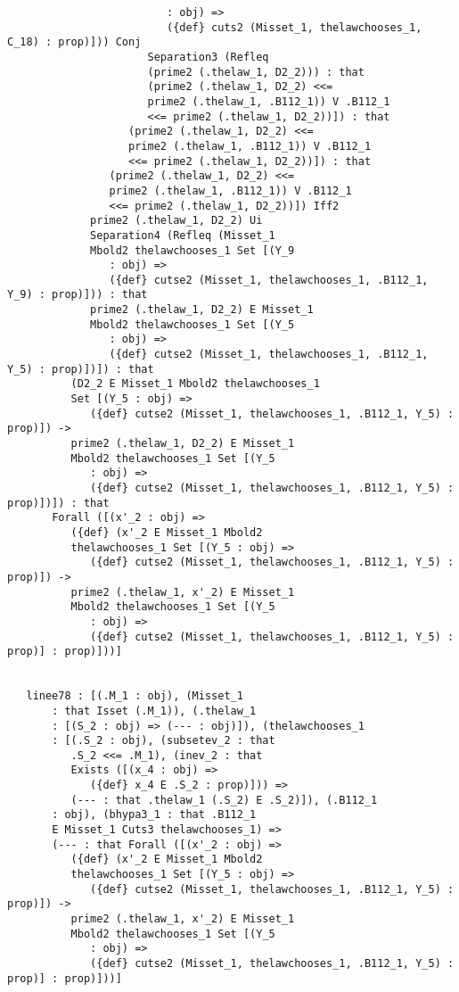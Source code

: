 \documentclass[12pt]{article}
\begin{document}
\begin{verbatim}
                         : obj) => 
                         ({def} cuts2 (Misset_1, thelawchooses_1, C_18) : prop)])) Conj 
                      Separation3 (Refleq 
                      (prime2 (.thelaw_1, D2_2))) : that 
                      (prime2 (.thelaw_1, D2_2) <<= 
                      prime2 (.thelaw_1, .B112_1)) V .B112_1 
                      <<= prime2 (.thelaw_1, D2_2))]) : that 
                   (prime2 (.thelaw_1, D2_2) <<= 
                   prime2 (.thelaw_1, .B112_1)) V .B112_1 
                   <<= prime2 (.thelaw_1, D2_2))]) : that 
                (prime2 (.thelaw_1, D2_2) <<= 
                prime2 (.thelaw_1, .B112_1)) V .B112_1 
                <<= prime2 (.thelaw_1, D2_2))]) Iff2 
             prime2 (.thelaw_1, D2_2) Ui 
             Separation4 (Refleq (Misset_1 
             Mbold2 thelawchooses_1 Set [(Y_9 
                : obj) => 
                ({def} cutse2 (Misset_1, thelawchooses_1, .B112_1, Y_9) : prop)])) : that 
             prime2 (.thelaw_1, D2_2) E Misset_1 
             Mbold2 thelawchooses_1 Set [(Y_5 
                : obj) => 
                ({def} cutse2 (Misset_1, thelawchooses_1, .B112_1, Y_5) : prop)])]) : that 
          (D2_2 E Misset_1 Mbold2 thelawchooses_1 
          Set [(Y_5 : obj) => 
             ({def} cutse2 (Misset_1, thelawchooses_1, .B112_1, Y_5) : prop)]) -> 
          prime2 (.thelaw_1, D2_2) E Misset_1 
          Mbold2 thelawchooses_1 Set [(Y_5 
             : obj) => 
             ({def} cutse2 (Misset_1, thelawchooses_1, .B112_1, Y_5) : prop)])]) : that 
       Forall ([(x'_2 : obj) => 
          ({def} (x'_2 E Misset_1 Mbold2 
          thelawchooses_1 Set [(Y_5 : obj) => 
             ({def} cutse2 (Misset_1, thelawchooses_1, .B112_1, Y_5) : prop)]) -> 
          prime2 (.thelaw_1, x'_2) E Misset_1 
          Mbold2 thelawchooses_1 Set [(Y_5 
             : obj) => 
             ({def} cutse2 (Misset_1, thelawchooses_1, .B112_1, Y_5) : prop)] : prop)]))]


   linee78 : [(.M_1 : obj), (Misset_1 
       : that Isset (.M_1)), (.thelaw_1 
       : [(S_2 : obj) => (--- : obj)]), (thelawchooses_1 
       : [(.S_2 : obj), (subsetev_2 : that 
          .S_2 <<= .M_1), (inev_2 : that 
          Exists ([(x_4 : obj) => 
             ({def} x_4 E .S_2 : prop)])) => 
          (--- : that .thelaw_1 (.S_2) E .S_2)]), (.B112_1 
       : obj), (bhypa3_1 : that .B112_1 
       E Misset_1 Cuts3 thelawchooses_1) => 
       (--- : that Forall ([(x'_2 : obj) => 
          ({def} (x'_2 E Misset_1 Mbold2 
          thelawchooses_1 Set [(Y_5 : obj) => 
             ({def} cutse2 (Misset_1, thelawchooses_1, .B112_1, Y_5) : prop)]) -> 
          prime2 (.thelaw_1, x'_2) E Misset_1 
          Mbold2 thelawchooses_1 Set [(Y_5 
             : obj) => 
             ({def} cutse2 (Misset_1, thelawchooses_1, .B112_1, Y_5) : prop)] : prop)]))]



\end{verbatim}
\end{document}
